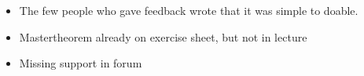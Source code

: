 \begin{frame}{\LectureFeedbackExercisesTitle}
  \begin{itemize}
  \item <2->The few people who gave feedback wrote that it was simple to doable.
  \item <3->Mastertheorem already on exercise sheet, but not in lecture
  \item <4->Missing support in forum
  \end{itemize}
\end{frame}
